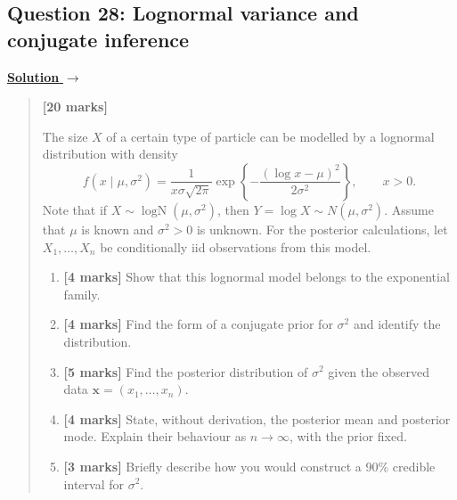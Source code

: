 \documentclass[11pt,a4paper]{article}
\newcommand{\xvec}{\boldsymbol{x}}
\newenvironment{examquestion}[2]
  {\subsection{#1}\label{question:\arabic{subsection}}\label{#2}%
   \noindent\hyperref[answer:\arabic{subsection}]{\textbf{Solution} $\rightarrow$}%
   \begin{quote}\color{statgrey}}
  {\end{quote}}
\begin{document}
\begin{examquestion}{Question 28: Lognormal variance and conjugate inference}{question:practice-lognormal-variance-and-conjugate-inference}
\textbf{[20 marks]}

The size $X$ of a certain type of particle can be modelled by a lognormal
distribution with density
\[
f(x\mid\mu,\sigma^2)
=\frac1{x\sigma\sqrt{2\pi}}
\exp\!\left\{-\frac{(\log x-\mu)^2}{2\sigma^2}\right\},
\qquad x>0.
\]
Note that if $X\sim\operatorname{logN}(\mu,\sigma^2)$, then
$Y=\log X\sim N(\mu,\sigma^2)$. Assume that $\mu$ is known and
$\sigma^2>0$ is unknown. For the posterior calculations, let
$X_1,\ldots,X_n$ be conditionally iid observations from this model.

\begin{enumerate}[label=(\roman*)]
  \item \textbf{[4 marks]} Show that this lognormal model belongs to the
        exponential family.
  \item \textbf{[4 marks]} Find the form of a conjugate prior for
        $\sigma^2$ and identify the distribution.
  \item \textbf{[5 marks]} Find the posterior distribution of $\sigma^2$
        given the observed data $\xvec=(x_1,\ldots,x_n)$.
  \item \textbf{[4 marks]} State, without derivation, the posterior mean
        and posterior mode. Explain their behaviour as $n\to\infty$,
        with the prior fixed.
  \item \textbf{[3 marks]} Briefly describe how you would construct a
        90\% credible interval for $\sigma^2$.
\end{enumerate}
\end{examquestion}

\clearpage
\end{document}
